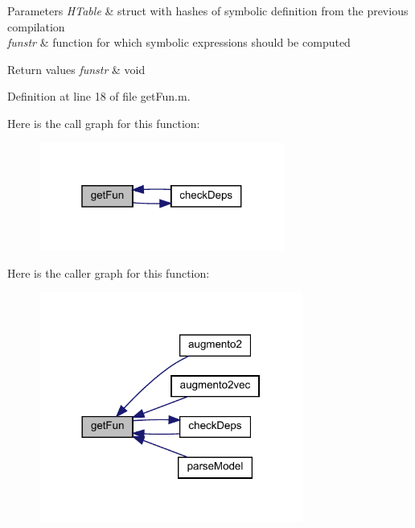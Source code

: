 \begin{DoxyParams}{Parameters}
{\em H\+Table} & struct with hashes of symbolic definition from the previous compilation \\
\hline
{\em funstr} & function for which symbolic expressions should be computed\\
\hline
\end{DoxyParams}

\begin{DoxyRetVals}{Return values}
{\em funstr} & void \\
\hline
\end{DoxyRetVals}


Definition at line 18 of file get\+Fun.\+m.

Here is the call graph for this function\+:
\nopagebreak
\begin{figure}[H]
\begin{center}
\leavevmode
\includegraphics[width=229pt]{classamimodel_a08d58ae650e5ff9310760f6d3f08015c_cgraph}
\end{center}
\end{figure}
Here is the caller graph for this function\+:
\nopagebreak
\begin{figure}[H]
\begin{center}
\leavevmode
\includegraphics[width=245pt]{classamimodel_a08d58ae650e5ff9310760f6d3f08015c_icgraph}
\end{center}
\end{figure}
\mbox{\label{classamimodel_a4d4b20c81af6d7ed977b6b818c7b22db}} 
